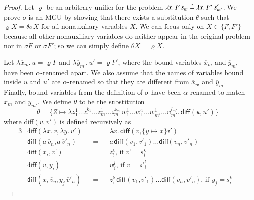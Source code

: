 \begin{proof}
  Let $\varrho$ be an arbitrary unifier for the problem $\lambda
  \overline{x}.\, F \, \overline{s}_m \unif \lambda\overline{x}.\, F' \,
  \overline{s}'_{m'}$. We prove $\sigma$ is an MGU by showing that there exists a substitution
  $\theta$ such that $\varrho X = \theta\sigma X$ for all nonauxiliary variables $X$. 
  We can focus only on $X \in \{F, F'\}$
  because all other nonauxiliary variables
  do neither appear in the original problem nor in $\sigma F$ or $\sigma F'$; so we can simply define $\theta X = \varrho X$.


  Let $\lambda \overline{x}_m. \, u = \varrho F$ and  $\lambda \overline{y}_{m'}. \, u' = \varrho{F'}$, where
  the bound variables $\overline{x}_m$ and $\overline{y}_{m'}$ have been $\alpha$-renamed apart. We also assume
  that the names of variables bound inside $u$ and $u'$ are $\alpha$-renamed so that they are different from $\overline{x}_m$ and
  $\overline{y}_{m'}$. Finally, bound variables
  from the definition of $\sigma$ have been $\alpha$-renamed to match $\overline{x}_m$ and $\overline{y}_{m'}$.
  We
  define $\theta$ to be the substitution
  \[\theta = \{ Z \mapsto \lambda z_1^1 \ldots z_1^{k_1} \ldots z_m^1 \ldots z_m^{k_m} \, w_1^{1} \ldots w_1^{l_1} \ldots w_{m'}^1 \ldots  w_{m'}^{l_{m'}}. \, \textsf{diff}(u, u') \}\]
  where \textsf{diff}$(v,v')$ is defined recursively as
  \begin{alignat}{3}
    &\textsf{diff}(\lambda x.\, v, \lambda y.\, v') &&{}={}&& \lambda x. \, \textsf{diff}(v, \{y \mapsto x\}v') \label{diff:alpha} \\
    &\textsf{diff}(a \, \overline{v}_n, a \, \overline{v}'_n) &&=&&  a \, \textsf{diff}(v_1, v'_1) \ldots \textsf{diff}(v_n, v'_n) \label{diff:samehd} \\
    &\textsf{diff}(x_i, v') &&=&&  z_i^k \text{, if $v' = {s}_i^k$ } \label{diff:xi}  \\
    &\textsf{diff}(v, y_i) &&=&&  w_i^l \text{, if $v = {s'}_i^l$ } \label{diff:yi}  \\
    &\textsf{diff}(x_i \, \overline{v}_n, y_j \, \overline{v}'_n) &&=&&  z_i^k \, \textsf{diff}(v_1, v'_1) \ldots \textsf{diff}(v_n, v'_n) \text{, if $y_j = s_i^k $ } \label{diff:xiyj} 
  \end{alignat}


\end{proof}
